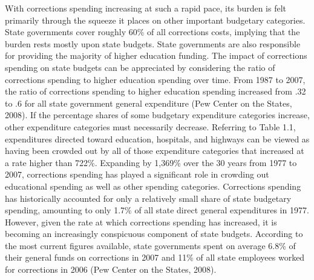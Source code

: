 With corrections spending increasing at such a rapid pace, its burden is felt primarily through the squeeze it places on other important budgetary categories.  State governments cover roughly 60\% of all corrections costs, implying that the burden rests mostly upon state budgets.  State governments are also responsible for providing the majority of higher education funding.  The impact of corrections spending on state budgets can be appreciated by considering the ratio of corrections spending to higher education spending over time.  From 1987 to 2007, the ratio of corrections spending to higher education spending increased from .32 to .6 for all state government general expenditure (Pew Center on the States, 2008).  If the percentage shares of some budgetary expenditure categories increase, other expenditure categories must necessarily decrease.  Referring to Table 1.1, expenditures directed toward education, hospitals, and highways can be viewed as having been crowded out by all of those expenditure categories that increased at a rate higher than 722\%.  Expanding by 1,369\% over the 30 years from 1977 to 2007, corrections spending has played a significant role in crowding out educational spending as well as other spending categories.  Corrections spending has historically accounted for only a relatively small share of state budgetary spending, amounting to only 1.7\% of all state direct general expenditures in 1977.  However, given the rate at which corrections spending has increased, it is becoming an increasingly conspicuous component of state budgets.  According to the most current figures available, state governments spent on average 6.8\% of their general funds on corrections in 2007 and 11\% of all state employees worked for corrections in 2006 (Pew Center on the States, 2008).

